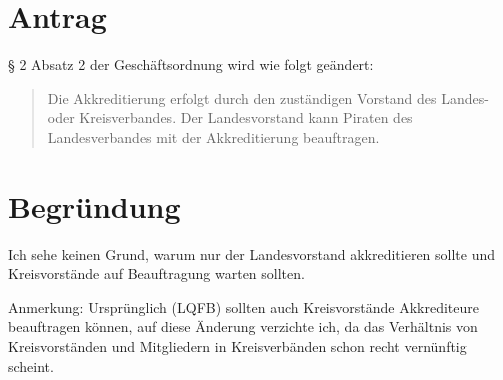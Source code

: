 \section{Antrag}

§ 2 Absatz 2 der Geschäftsordnung wird wie folgt geändert:

\begin{quote}
Die Akkreditierung erfolgt durch den zuständigen Vorstand des Landes- oder Kreisverbandes. Der Landesvorstand kann Piraten des Landesverbandes mit der Akkreditierung beauftragen.

\end{quote}
\section{Begründung}

Ich sehe keinen Grund, warum nur der Landesvorstand akkreditieren sollte und Kreisvorstände auf Beauftragung warten sollten.

Anmerkung: Ursprünglich (LQFB) sollten auch Kreisvorstände Akkrediteure beauftragen können, auf diese Änderung verzichte ich, da das Verhältnis von Kreisvorständen und Mitgliedern in Kreisverbänden schon recht vernünftig scheint.
